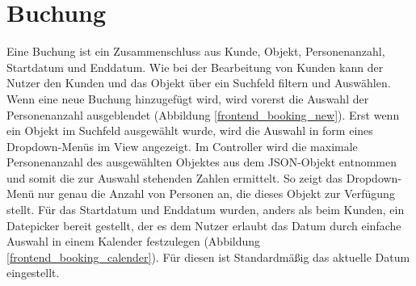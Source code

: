 \section{Buchung}
Eine Buchung ist ein Zusammenschluss aus Kunde, Objekt, Personenanzahl, Startdatum und Enddatum. Wie bei der Bearbeitung von Kunden kann der Nutzer den Kunden und das Objekt über ein Suchfeld filtern und Auswählen. Wenn eine neue Buchung hinzugefügt wird, wird vorerst die Auswahl der Personenanzahl ausgeblendet (Abbildung \ref{frontend_booking_new}). Erst wenn ein Objekt im Suchfeld ausgewählt wurde, wird die Auswahl in form eines Dropdown-Menüs im View angezeigt. Im Controller wird die maximale Personenanzahl des ausgewählten Objektes aus dem JSON-Objekt entnommen und somit die zur Auswahl stehenden Zahlen ermittelt. So zeigt das Dropdown-Menü nur genau die Anzahl von Personen an, die dieses Objekt zur Verfügung stellt.
Für das Startdatum und Enddatum wurden, anders als beim Kunden, ein Datepicker bereit gestellt, der es dem Nutzer erlaubt das Datum durch einfache Auswahl in einem Kalender festzulegen (Abbildung \ref{frontend_booking_calender}). Für diesen ist Standardmäßig das aktuelle Datum eingestellt.


